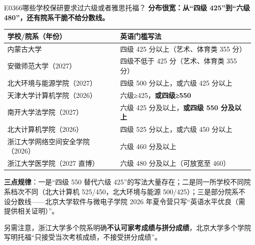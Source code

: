 \begin{qa}{E0366}{哪些学校保研要求过六级或者雅思托福？}
\textbf{分布很宽：从“四级 425”到“六级 480”，还有院系干脆不给分数线。}

\par\vspace{2pt}\nobreak\begin{center}\footnotesize
\begin{tabularx}{\textwidth}{>{\raggedright\arraybackslash}X>{\raggedright\arraybackslash}X}
\toprule
\textbf{学校/院系（年份）} & \textbf{英语门槛写法} \\ \midrule
内蒙古大学 & 四级 425 分以上（艺术、体育类 355 分） \\
安徽师范大学（2027） & 四级不低于 425 分（艺术、体育类 355 分） \\
北大环境与能源学院（2027） & 四级 500 分以上，或六级 425 分以上 \\
天津大学计算机学院（2026） & 六级≥425，\textbf{或四级≥550} \\
南开大学法学院（2027） & 六级 425 分及以上，\textbf{或四级 550 分及以上} \\
北大计算机学院（2026） & 四级 525 分以上，或六级 450 分以上 \\
浙江大学网络空间安全学院（2026） & 六级 460 分及以上 \\
浙江大学医学院（2027 直博） & 六级 480 分及以上（可放宽至 460） \\
\bottomrule
\end{tabularx}
\end{center}\vspace{2pt}\par

\textbf{三点规律}：一是“四级 550 替代六级 425”的写法大量存在；二是同一所学校不同院系档次不同（北大计算机 525/450，北大环境与能源 500/425）；三是部分院系不设分数线——北京大学软件与微电子学院 2026 年夏令营只写“英语水平优良（需提供相关证明）”。

另需注意，浙江大学多个院系明确\textbf{不认可家考成绩与拼分成绩}，北京大学多个学院写明托福“只接受当次考核成绩，不接受拼分成绩”。
\end{qa}

